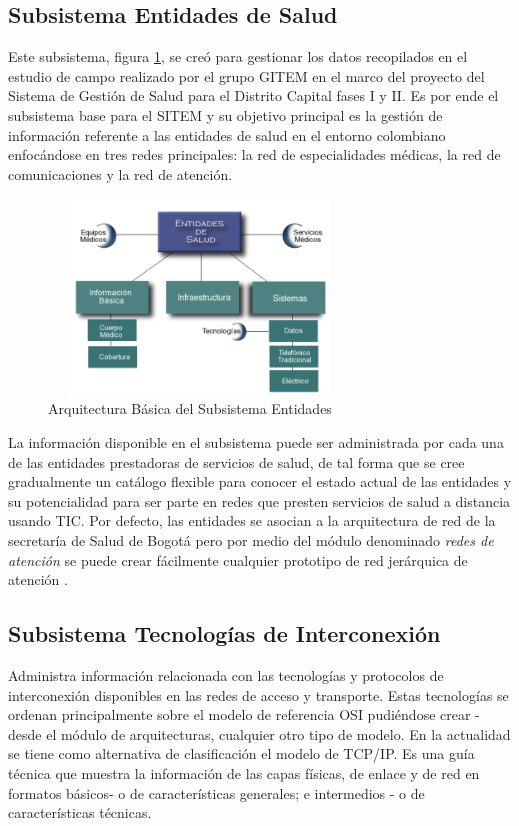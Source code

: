 \subsection{Subsistema Entidades de Salud} 
Este subsistema, figura \ref{entidades}, se creó para gestionar los datos recopilados en el estudio de campo realizado por el grupo GITEM en el marco del proyecto del Sistema de Gestión de Salud para el Distrito Capital fases I y II. Es por ende el subsistema base para el SITEM y su objetivo principal es la gestión de información referente a las entidades de salud en el entorno colombiano enfocándose en tres redes principales: la red de especialidades médicas, la red de comunicaciones y la red de atención.

\begin{figure}
 \centering
 \includegraphics[width=80mm, height=52mm]{entidades.png}
 \caption{Arquitectura Básica del Subsistema Entidades}
\label{entidades}
\end{figure}

La información disponible en el subsistema puede ser administrada por cada una de las entidades prestadoras de servicios de salud, de tal forma que se cree gradualmente un catálogo flexible para conocer el estado actual de las entidades y su potencialidad para ser parte en redes que presten servicios de salud a distancia usando TIC. Por defecto, las entidades se asocian a la arquitectura de red de la secretaría de Salud de Bogotá pero por medio del módulo denominado \textit{redes de atención} se puede crear fácilmente cualquier prototipo de red jerárquica de atención \cite{yellowlees}.

\subsection{Subsistema Tecnologías de Interconexión} 
Administra información relacionada con las tecnologías y protocolos de interconexión disponibles en las redes de acceso y transporte. Estas tecnologías se ordenan principalmente sobre el modelo de referencia OSI pudiéndose crear  - desde el módulo de arquitecturas, cualquier otro tipo de modelo. En la actualidad se tiene como alternativa de clasificación el modelo de TCP/IP. Es una guía técnica que muestra la información de las capas físicas, de enlace y de red en formatos básicos- o de características generales; e intermedios - o de características técnicas.


